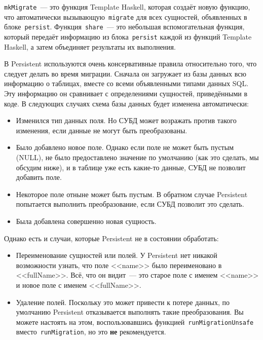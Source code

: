 \lstinline'mkMigrate'~--- это функция Template Haskell, которая создаёт новую
функцию, что автоматически вызывающую~\lstinline'migrate' для всех сущностей,
объявленных в блоке~\lstinline'persist'. Функция~\lstinline'share'~--- это
небольшая вспомогательная функция, который передаёт информацию из
блока~\lstinline'persist' каждой из функций Template Haskell, а затем
объединяет результаты их выполнения.

В Persistent используются очень консервативные правила относительно того, что
следует делать во время миграции. Сначала он загружает из базы данных всю
информацию о таблицах, вместе со всеми объявленными типами данных SQL. Эту
информацию он сравнивает с определениями сущностей, приведёнными в коде. В
следующих случаях схема базы данных будет изменена автоматически:

\begin{itemize}
    \item Изменился тип данных поля. Но СУБД может возражать против такого
        изменения, если данные не могут быть преобразованы.

    \item Было добавлено новое поле. Однако если поле не может быть пустым
        (NULL), не было предоставлено значение по умолчанию (как это сделать,
        мы обсудим ниже), и в таблице уже есть какие-то данные, СУБД не
        позволит добавить поле.

    \item Некоторое поле отныне может быть пустым. В обратном случае Persistent
        попытается выполнить преобразование, если СУБД позволит это сделать.

    \item Была добавлена совершенно новая сущность.
\end{itemize}

Однако есть и случаи, которые Persistent не в состоянии обработать:

\begin{itemize}
    \item Переименование сущностей или полей. У Persistent нет никакой
        возможности узнать, что поле <<name>> было переименовано в
        <<fullName>>. Всё, что он видит~--- это старое поле с именем <<name>> и
        новое поле с именем <<fullName>>.

    \item Удаление полей. Поскольку это может привести к потере данных, по
        умолчанию Persistent отказывается выполнять такие преобразования. Вы
        можете настоять на этом, воспользовавшись
        функцией~\lstinline'runMigrationUnsafe'
        вместо~\lstinline'runMigration', но это \textbf{не} рекомендуется.
\end{itemize}

